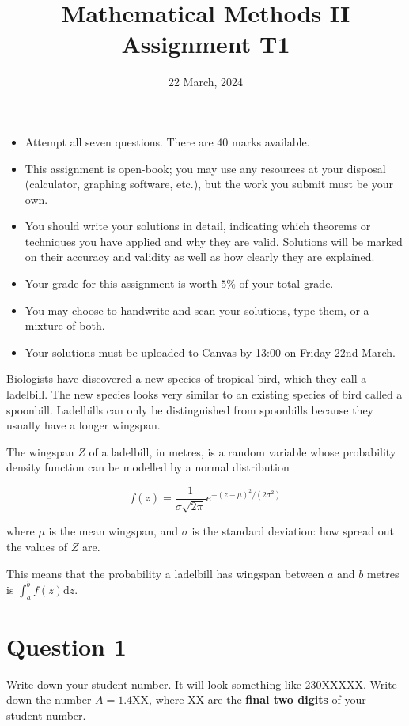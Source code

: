 \documentclass[12pt]{article}
\author{}
\title{Mathematical Methods II Assignment T1 }
\date{22 March, 2024}
\begin{document}
\maketitle
    \begin{itemize}
          \item Attempt all seven questions. There are 40 marks available.
          \item This assignment is open-book; you may use any resources at your disposal (calculator, graphing software, etc.), but the work you submit must be your own.
          \item You should write your solutions in detail, indicating which theorems or techniques you have applied and why they are valid. Solutions will be marked on their accuracy and validity as well as how clearly they are explained.
          \item Your grade for this assignment is worth $5 \%$ of your total grade.
          \item You may choose to handwrite and scan your solutions, type them, or a mixture of both.
          \item Your solutions must be uploaded to Canvas by 13:00 on Friday 22nd March.
        \end{itemize}
    \newpage
    
Biologists have discovered a new species of tropical bird, which they call a ladelbill. The new species looks very similar to an existing species of bird called a spoonbill. Ladelbills can only be distinguished from spoonbills because they usually have a longer wingspan.

The wingspan $Z$ of a ladelbill, in metres, is a random variable whose probability density function can be modelled by a normal distribution

$$
f(z)=\frac{1}{\sigma \sqrt{2 \pi}} e^{-(z-\mu)^{2} /\left(2 \sigma^{2}\right)}
$$

where $\mu$ is the mean wingspan, and $\sigma$ is the standard deviation: how spread out the values of $Z$ are.

This means that the probability a ladelbill has wingspan between $a$ and $b$ metres is $\int_{a}^{b} f(z) \mathrm{d} z$.

\section*{Question 1}
Write down your student number. It will look something like 230XXXXX. Write down the number $A=1.4 \mathrm{XX}$, where $\mathrm{XX}$ are the \textbf{final two digits} of your student number.
\end{document}
